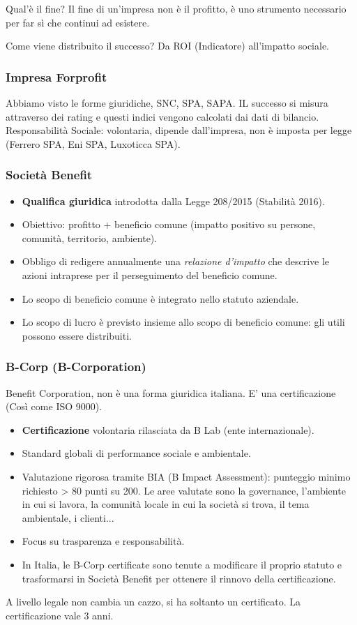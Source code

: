 \documentclass[a4paper,12pt]{article}
\begin{document}
	Qual'è il fine? Il fine di un'impresa non è il profitto, è uno strumento necessario per far sì che continui ad esistere. 
	
	Come viene distribuito il successo? Da ROI (Indicatore) all'impatto sociale.
	
	\subsubsection{Impresa Forprofit}
	Abbiamo visto le forme giuridiche, SNC, SPA, SAPA. IL successo si misura attraverso dei rating e questi indici vengono calcolati dai dati di bilancio. Responsabilità Sociale: volontaria, dipende dall'impresa, non è imposta per legge (Ferrero SPA, Eni SPA, Luxoticca SPA).
	
	\subsubsection{Società Benefit}
	
	\begin{itemize}
		\item \textbf{Qualifica giuridica} introdotta dalla Legge 208/2015 (Stabilità 2016).
		\item Obiettivo: profitto + beneficio comune (impatto positivo su persone, comunità, territorio, ambiente).
		\item Obbligo di redigere annualmente una \emph{relazione d'impatto} che descrive le azioni intraprese per il perseguimento del beneficio comune.
		\item Lo scopo di beneficio comune è integrato nello statuto aziendale.
		\item Lo scopo di lucro è previsto insieme allo scopo di beneficio comune: gli utili possono essere distribuiti.
	\end{itemize}
	
	\subsubsection{B-Corp (B-Corporation)}
	Benefit Corporation, non è una forma giuridica italiana. E' una certificazione (Così come ISO 9000).
	\begin{itemize}
		\item \textbf{Certificazione} volontaria rilasciata da B Lab (ente internazionale).
		\item Standard globali di performance sociale e ambientale.
		\item Valutazione rigorosa tramite BIA (B Impact Assessment): punteggio minimo richiesto > 80 punti su 200. Le aree valutate sono la governance, l'ambiente in cui si lavora, la comunità locale in cui la società si trova, il tema ambientale, i clienti...
		\item Focus su trasparenza e responsabilità.
		\item In Italia, le B-Corp certificate sono tenute a modificare il proprio statuto e trasformarsi in Società Benefit per ottenere il rinnovo della certificazione.
	\end{itemize}
	A livello legale non cambia un cazzo, si ha soltanto un certificato. La certificazione vale 3 anni.
\end{document}

